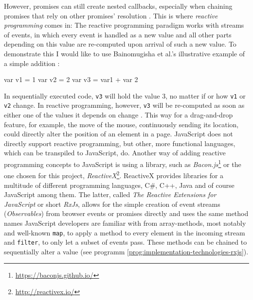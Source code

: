 However, promises can still create nested callbacks, especially when chaining promises that rely on other promises' resolution \cite{reactive-vs-promises}. This is where \emph{reactive programming} comes in: The reactive programming paradigm works with streams of events, in which every event is handled as a new value and all other parts depending on this value are re-computed upon arrival of such a new value. To demonstrate this I would like to use Bainomugisha et al.'s illustrative example of a simple addition \cite{reactive-programming-survey}:

\begin{JsCode}
var v1 = 1
var v2 = 2
var v3 = var1 + var 2
\end{JsCode}
%
In sequentially executed code, \texttt{v3} will hold the value $3$, no matter if or how \texttt{v1} or \texttt{v2} change. In reactive programming, however, \texttt{v3} will be re-computed as soon as either one of the values it depends on change \cite{reactive-programming-survey}. This way for a drag-and-drop feature, for example, the move of the mouse, continuously sending its location, could directly alter the position of an element in a page. JavaScript does not directly support reactive programming, but other, more functional languages, which can be transpiled to JavaScript, do. Another way of adding reactive programming concepts to JavaScript is using a library, such as \emph{Bacon.js}\footnote{\url{https://baconjs.github.io/}} or the one chosen for this project, \emph{ReactiveX}\footnote{\url{http://reactivex.io/}}. ReactiveX provides libraries for a multitude of different programming languages, C#, C++, Java and of course JavaScript among them. The latter, called \emph{The Reactive Extensions for JavaScript} or short \emph{RxJs}, allows for the simple creation of event streams (\emph{Observables}) from browser events or promises directly and uses the same method names JavaScript developers are familiar with from array-methods, most notably and well-known \texttt{map}, to apply a method to every element in the incoming stream and \texttt{filter}, to only let a subset of events pass. These methods can be chained to sequentially alter a value (see programm \ref{prog:implementation-technologies-rxjs}).


